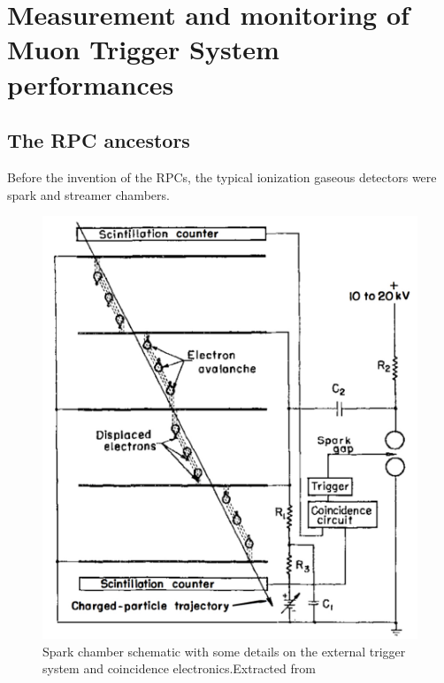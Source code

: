 \chapter{Measurement and monitoring of Muon Trigger System performances}

\section{The RPC ancestors}
Before the invention of the RPCs, the typical ionization gaseous detectors were spark and streamer chambers.

\begin{figure}[!t]
\begin{center}
\includegraphics[width=0.95\linewidth]{Chapters/Performance/Figs/spark-chambers.pdf}
\caption{Spark chamber schematic with some details on the external trigger system and coincidence electronics.Extracted from \cite{wenzel:1966}}
\label{fig:SparkChamber}
\end{center}
\end{figure}

